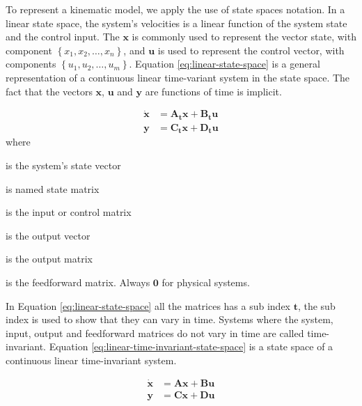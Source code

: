 \documentclass[12pt]{article}
\newcommand{\bvec}[1]{\boldsymbol{\mathbf{#1}}} %
\newcommand{\mat}[1]{\boldsymbol{\mathbf{#1}}}
\newcommand{\cbrac}[1]{\left\{#1\right\}} %
\begin{document}
To represent a kinematic model, we apply the use of state spaces notation. In a linear state space, the system's velocities is a linear function of the system state and the control input. The $\bvec{x}$ is commonly used to represent the vector state, with component $\cbrac{x_1, x_2, \dots, x_n}$, and $\bvec{u}$ is used to represent the control vector, with components $\cbrac{u_1, u_2, \dots, u_m}$. Equation \ref{eq:linear-state-space} is a general representation of a continuous linear time-variant system in the state space. The fact that the vectors $\bvec{x}$, $\bvec{u}$ and $\bvec{y}$ are functions of time is implicit.

\begin{equation}
    \begin{aligned}
        \bvec{\dot{x}} &= \mat{A_t} \bvec{x} + \mat{B_t} \bvec{u} \\
        \bvec{y} &= \mat{C_t} \bvec{x} + \mat{D_t} \bvec{u}
    \end{aligned}
    \label{eq:linear-state-space}
\end{equation}
\noindent where
\begin{description}[labelindent=10pt, labelsep=10pt]
    \item[$\bvec{x}$] is the system's state vector
    \item[$\mat{A_t}$] is named state matrix
    \item[$\mat{B_t}$] is the input or control matrix
    \item[$\bvec{y}$] is the output vector
    \item[$\mat{C_t}$] is the output matrix
    \item[$\mat{D_t}$] is the feedforward matrix. Always $\mat{0}$ for physical systems.
\end{description}

In Equation \ref{eq:linear-state-space} all the matrices has a sub index $\mathbf{t}$, the sub index is used to show that they can vary in time. Systems where the system, input, output and feedforward matrices do not vary in time are called time-invariant. Equation \ref{eq:linear-time-invariant-state-space} is a state space of a continuous linear time-invariant system.

\begin{equation}
    \begin{aligned}
        \bvec{\dot{x}} &= \mat{A} \bvec{x} + \mat{B} \bvec{u} \\
        \bvec{y} &= \mat{C} \bvec{x} + \mat{D} \bvec{u}
    \end{aligned}
    \label{eq:linear-time-invariant-state-space}
\end{equation}
\end{document}
